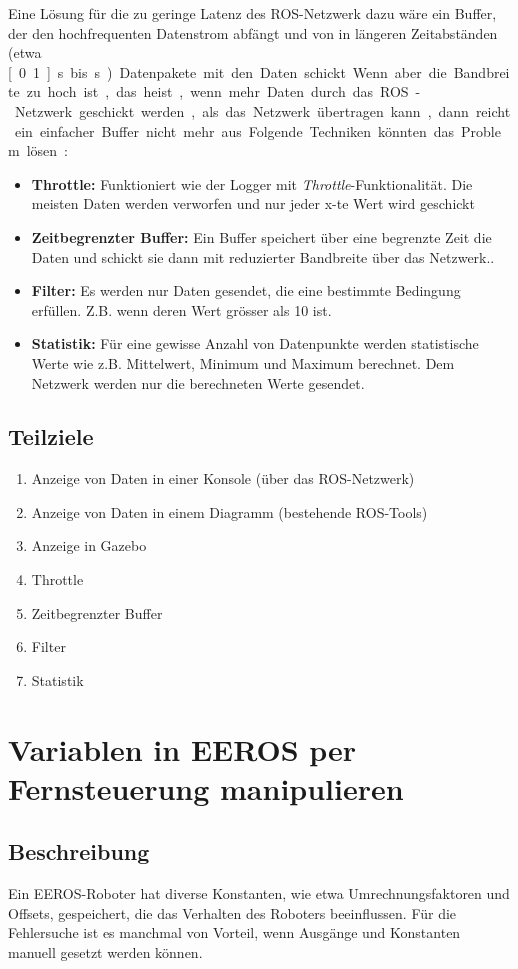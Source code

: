 Eine Lösung für die zu geringe Latenz des ROS-Netzwerk dazu wäre ein Buffer, der den hochfrequenten Datenstrom abfängt und von in längeren Zeitabständen (etwa \unit[0.1]{s} bis \unit[1]{s}) Datenpakete mit den Daten schickt.

Wenn aber die Bandbreite zu hoch ist, das heist, wenn mehr Daten durch das ROS-Netzwerk geschickt werden, als das Netzwerk übertragen kann, dann reicht ein einfacher Buffer nicht mehr aus.
Folgende Techniken könnten das Problem lösen:
\begin{itemize}
\item \textbf{Throttle:} Funktioniert wie der Logger mit \textit{Throttle}-Funktionalität. Die meisten Daten werden verworfen und nur jeder x-te Wert wird geschickt
\item \textbf{Zeitbegrenzter Buffer:} Ein Buffer speichert über eine begrenzte Zeit die Daten und schickt sie dann mit reduzierter Bandbreite über das Netzwerk..
\item \textbf{Filter:} Es werden nur Daten gesendet, die eine bestimmte Bedingung erfüllen. Z.B. wenn deren Wert grösser als 10 ist.
\item \textbf{Statistik:} Für eine gewisse Anzahl von Datenpunkte werden statistische Werte wie z.B. Mittelwert, Minimum und Maximum berechnet. Dem Netzwerk werden nur die berechneten Werte gesendet.
\end{itemize}

\subsection{Teilziele}
\begin{enumerate}
\item Anzeige von Daten in einer Konsole (über das ROS-Netzwerk)
\item Anzeige von Daten in einem Diagramm (bestehende ROS-Tools)
\item Anzeige in Gazebo
\item Throttle
\item Zeitbegrenzter Buffer
\item Filter
\item Statistik
\end{enumerate}


\section{Variablen in EEROS per Fernsteuerung manipulieren}
\subsection{Beschreibung}
Ein EEROS-Roboter hat diverse Konstanten, wie etwa Umrechnungsfaktoren und Offsets, gespeichert, die das Verhalten des Roboters beeinflussen.
Für die Fehlersuche ist es manchmal von Vorteil, wenn Ausgänge und Konstanten manuell gesetzt werden können.

